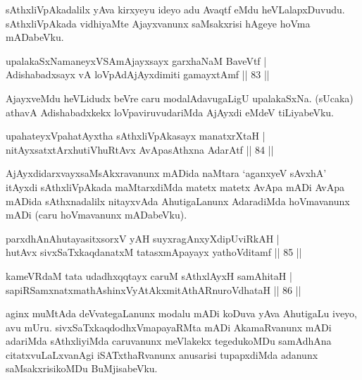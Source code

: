\begin{artha}
sAthxliVpAkadalilx yAva kirxyeyu ideyo adu Avaqtf eMdu 
heVLalapxDuvudu. sAthxliVpAkada vidhiyaMte Ajayxvanunx saMsakxrisi 
hAgeye hoVma mADabeVku.
\end{artha}

\begin{shl}
upalakaSxNamaneyxVSAmAjayxsayx garxhaNaM BaveVtf | \\
Adishabadxsayx vA loVpAdAjAyxdimiti gamayxtAmf \hfill|| 83 || 
\end{shl}

\begin{artha}
AjayxveMdu heVLidudx beVre caru modalAdavugaLigU upalakaSxNa. (sUcaka) 
athavA Adishabadxkekx loVpaviruvudariMda AjAyxdi eMdeV tiLiyabeVku.
\end{artha}


\begin{shl}
upahateyxVpahatAyxtha sAthxliVpAkasayx manatxrXtaH | \\
nitAyxsatxtArx\s \s hutiVhuRtAvx AvApasAthxna AdarAtf \hfill|| 84 || 
\end{shl}

\begin{artha}
AjAyxdidarxvayxsaMsAkxravanunx mADida naMtara `aganxyeV sAvxhA' 
itAyxdi sAthxliVpAkada maMtarxdiMda matetx matetx AvApa mADi AvApa 
mADida sAthxnadalilx nitayxvAda AhutigaLanunx AdaradiMda hoVmavanunx 
mADi (caru hoVmavanunx mADabeVku).
\end{artha}


\begin{shl}
parxdhAnAhutayasitxsorxV yAH suyxragAnxyXdipUviRkAH | \\
hutAvx sivxSaTxkaqdanatxM tatasxmApayayx yathoVditamf \hfill|| 85 || 
\end{shl}

\begin{shl}
kameVRdaM tata udadhxqqtayx caruM sAthxlAyxH samAhitaH | \\
sapiRSamxnatxmathAshinxVyAtAkxmitAthARnuroVdhataH \hfill|| 86 || 
\end{shl}

\begin{artha}
aginx muMtAda deVvategaLanunx modalu mADi koDuva yAva AhutigaLu iveyo, 
avu mUru. sivxSaTxkaqdodhxVmapayaRMta mADi AkamaRvanunx mADi 
adariMda sAthxliyiMda caruvanunx meVlakekx tegedukoMDu samAdhAna 
citatxvuLaLxvanAgi iSATxthaRvanunx anusarisi tupapxdiMda adanunx 
saMsakxrisikoMDu BuMjisabeVku.
\end{artha}

